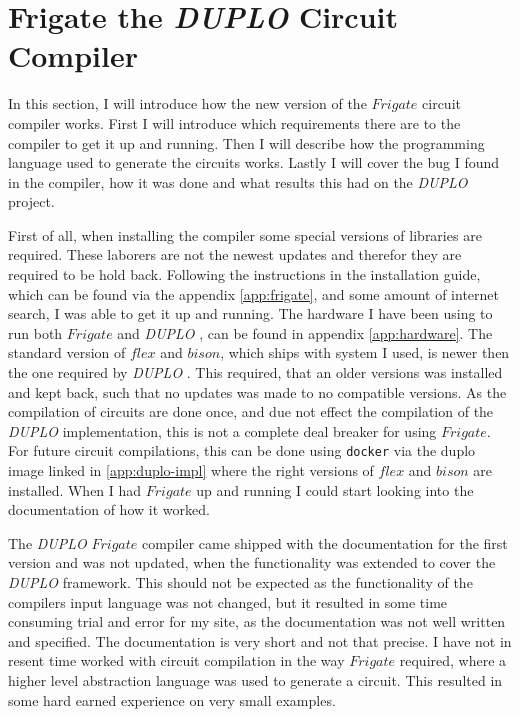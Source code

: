 \documentclass[twoside,11pt,openright]{report}
\newcommand{\DUPLO}{\textit{DUPLO} }
\begin{document}
\section{Frigate the \DUPLO Circuit Compiler}
\label{sec:frigate}
In this section, I will introduce how the new version of the $Frigate$ circuit compiler works. First I will introduce which requirements there are to the compiler to get it up and running. Then I will describe how the programming language used to generate the circuits works. Lastly I will cover the bug I found in the compiler, how it was done and what results this had on the \DUPLO project.

First of all, when installing the compiler some special versions of libraries are required. These laborers are not the newest updates and therefor they are required to be hold back. Following the instructions in the installation guide, which can be found via the appendix \ref{app:frigate}, and some amount of internet search, I was able to get it up and running. The hardware I have been using to run both $Frigate$ and \DUPLO, can be found in appendix \ref{app:hardware}. The standard version of $flex$ and $bison$, which ships with system I used, is newer then the one required by \DUPLO. This required, that an older versions was installed and kept back, such that no updates was made to no compatible versions. As the compilation of circuits are done once, and due not effect the compilation of the \DUPLO implementation, this is not a complete deal breaker for using $Frigate$. For future circuit compilations, this can be done using \verb|docker| via the duplo image linked in \ref{app:duplo-impl} where the right versions of $flex$ and $bison$ are installed. When I had $Frigate$ up and running I could start looking into the documentation of how it worked.

The \DUPLO $Frigate$ compiler came shipped with the documentation for the first version and was not updated, when the functionality was extended to cover the \DUPLO framework. This should not be expected as the functionality of the compilers input language was not changed, but it resulted in some time consuming trial and error for my site, as the documentation was not well written and specified. The documentation is very short and not that precise. I have not in resent time worked with circuit compilation in the way $Frigate$ required, where a higher level abstraction language was used to generate a circuit. This resulted in some hard earned experience on very small examples. 
\end{document}
